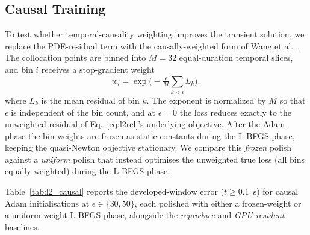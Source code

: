 
\subsection{Causal Training}

To test whether temporal-causality weighting improves the transient
solution, we replace the PDE-residual term with the causally-weighted
form of Wang et al.~\cite{wang2024causal}.  The collocation points are
binned into $M=32$ equal-duration temporal slices, and bin $i$ receives a
stop-gradient weight
\begin{equation}
  w_i = \exp\!\Big(-\tfrac{\epsilon}{M}\textstyle\sum_{k<i} L_k\Big),
  \label{eq:causal_weight}
\end{equation}
where $L_k$ is the mean residual of bin $k$.  The exponent is normalized
by $M$ so that $\epsilon$ is independent of the bin count, and at
$\epsilon=0$ the loss reduces exactly to the unweighted residual of
Eq.~\eqref{eq:l2rel}'s underlying objective.  After the Adam phase the bin
weights are frozen as static constants during the L-BFGS phase, keeping
the quasi-Newton objective stationary.  We compare this \emph{frozen}
polish against a \emph{uniform} polish that instead optimises the
unweighted true loss (all bins equally weighted) during the L-BFGS phase.

Table~\ref{tab:l2_causal} reports the developed-window error
($t\geq0.1$~s) for causal Adam initialisations at $\epsilon\in\{30,50\}$,
each polished with either a frozen-weight or a uniform-weight L-BFGS
phase, alongside the \emph{reproduce} and \emph{GPU-resident} baselines.

